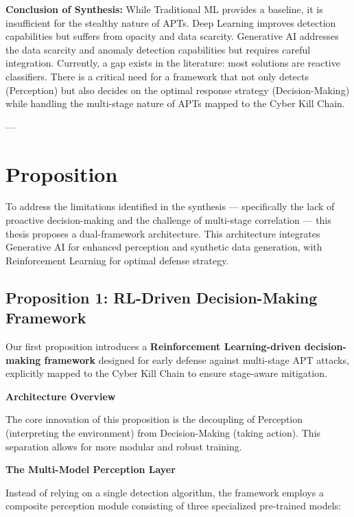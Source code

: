 \textbf{Conclusion of Synthesis:} While Traditional ML provides a baseline, it is insufficient for the stealthy nature of APTs. Deep Learning improves detection capabilities but suffers from opacity and data scarcity. Generative AI addresses the data scarcity and anomaly detection capabilities but requires careful integration. Currently, a gap exists in the literature: most solutions are reactive classifiers. There is a critical need for a framework that not only detects (Perception) but also decides on the optimal response strategy (Decision-Making) while handling the multi-stage nature of APTs mapped to the Cyber Kill Chain.

---

\section{Proposition}

To address the limitations identified in the synthesis — specifically the lack of proactive decision-making and the challenge of multi-stage correlation — this thesis proposes a dual-framework architecture. This architecture integrates Generative AI for enhanced perception and synthetic data generation, with Reinforcement Learning for optimal defense strategy.

\subsection{Proposition 1: RL-Driven Decision-Making Framework}

Our first proposition introduces a \textbf{Reinforcement Learning-driven decision-making framework} designed for early defense against multi-stage APT attacks, explicitly mapped to the Cyber Kill Chain to ensure stage-aware mitigation.

\textbf{Architecture Overview}

The core innovation of this proposition is the decoupling of Perception (interpreting the environment) from Decision-Making (taking action). This separation allows for more modular and robust training.

\textbf{The Multi-Model Perception Layer}

Instead of relying on a single detection algorithm, the framework employs a composite perception module consisting of three specialized pre-trained models:


